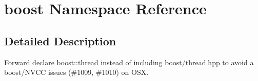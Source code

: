 \hypertarget{namespaceboost}{}\section{boost Namespace Reference}
\label{namespaceboost}


\subsection{Detailed Description}
Forward declare boost\+::thread instead of including boost/thread.\+hpp to avoid a boost/\+N\+V\+CC issues (\#1009, \#1010) on O\+SX. 